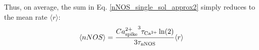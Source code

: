 \documentclass[10pt,letterpaper]{article}
\begin{document}
Thus, on average, the sum in Eq. \ref{nNOS_single_sol_approx2} simply reduces to the mean rate $\langle r \rangle$:
\begin{equation}
\langle nNOS \rangle = \frac{{Ca^{2+}_{\rm spike}}^3 \tau_{\rm Ca^{2+}}\ln(2)}{3\tau_{\rm nNOS}} \langle r \rangle
\label{nNOS_single_sol_approx3}
\end{equation}
\label{nNOS_approx_plot}
\end{document}
